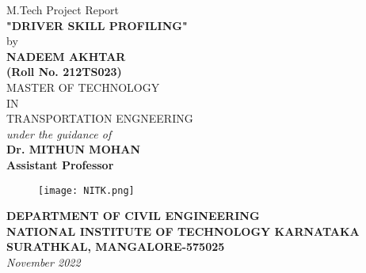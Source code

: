\documentclass[12pt,letterpaper]{report}
\begin{document}
\begin{titlepage}
\begin{center}
\vspace*{0cm}
\large M.Tech Project Report\\
\vspace*{0.5cm}
\textbf{\large "DRIVER SKILL PROFILING"}\\[10pt]
\vspace{0.3cm}
by\\ 
\vspace{0.3cm}
{\large \bf NADEEM AKHTAR } \\
\vspace*{0.2cm}
{\large \bf (Roll No. 212TS023)}\\[.3in]
{\large MASTER OF TECHNOLOGY\\IN\\TRANSPORTATION ENGNEERING}\\
                     \vspace{20mm}
                   {\em  under the guidance of} \\ \vspace{3mm}
             {\large \bf Dr. MITHUN MOHAN\\Assistant Professor} \\
\vspace{1cm}         
\begin{figure}[H]
\centering
\texttt{[image: NITK.png]}
\end{figure}
\vfill
{\bf\large DEPARTMENT OF CIVIL ENGINEERING} \\%
{\bf\large NATIONAL INSTITUTE OF TECHNOLOGY KARNATAKA}\\%
{\bf\large SURATHKAL, MANGALORE-575025}\\%
{\it\large November 2022}
\end{center}
\end{titlepage}

\end{document}
